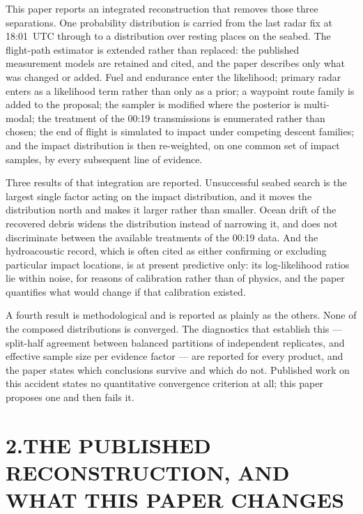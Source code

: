 \documentclass[12pt,a4paper]{article}
\begin{document}
This paper reports an integrated reconstruction that removes those three separations. One
probability distribution is carried from the last radar fix at 18:01~UTC through to a
distribution over resting places on the seabed. The flight-path estimator is extended rather
than replaced: the published measurement models are retained and cited, and the paper
describes only what was changed or added. Fuel and endurance enter the likelihood; primary
radar enters as a likelihood term rather than only as a prior; a waypoint route family is
added to the proposal; the sampler is modified where the posterior is multi-modal; the
treatment of the 00:19 transmissions is enumerated rather than chosen; the end of flight is
simulated to impact under competing descent families; and the impact distribution is then
re-weighted, on one common set of impact samples, by every subsequent line of evidence.

Three results of that integration are reported. Unsuccessful seabed search is the largest
single factor acting on the impact distribution, and it moves the distribution north and makes
it larger rather than smaller. Ocean drift of the recovered debris widens the distribution
instead of narrowing it, and does not discriminate between the available treatments of the
00:19 data. And the hydroacoustic record, which is often cited as either confirming or
excluding particular impact locations, is at present predictive only: its log-likelihood ratios
lie within noise, for reasons of calibration rather than of physics, and the paper quantifies
what would change if that calibration existed.

A fourth result is methodological and is reported as plainly as the others. None of the
composed distributions is converged. The diagnostics that establish this --- split-half
agreement between balanced partitions of independent replicates, and effective sample size per
evidence factor --- are reported for every product, and the paper states which conclusions
survive and which do not. Published work on this accident states no quantitative convergence
criterion at all; this paper proposes one and then fails it.

\section*{2.\quad THE PUBLISHED RECONSTRUCTION, AND WHAT THIS PAPER CHANGES}
\end{document}
